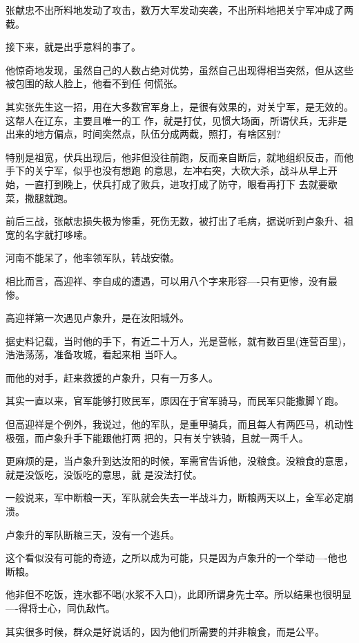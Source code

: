 \documentclass[11pt,a4paper,onecolumn]{article}
\begin{document}
张献忠不出所料地发动了攻击，数万大军发动突袭，不出所料地把关宁军冲成了两截。

接下来，就是出乎意料的事了。

他惊奇地发现，虽然自己的人数占绝对优势，虽然自己出现得相当突然，但从这些被包围的敌人脸上，他看不到任
何慌张。

其实张先生这一招，用在大多数官军身上，是很有效果的，对关宁军，是无效的。这帮人在辽东，主要且唯一的工
作，就是打仗，见惯大场面，所谓伏兵，无非是出来的地方偏点，时间突然点，队伍分成两截，照打，有啥区别?

特别是祖宽，伏兵出现后，他非但没往前跑，反而亲自断后，就地组织反击，而他手下的关宁军，似乎也没有想跑
的意思，左冲右突，大砍大杀，战斗从早上开始，一直打到晚上，伏兵打成了败兵，进攻打成了防守，眼看再打下
去就要歇菜，撒腿就跑。

前后三战，张献忠损失极为惨重，死伤无数，被打出了毛病，据说听到卢象升、祖宽的名字就打哆嗦。

河南不能呆了，他率领军队，转战安徽。

相比而言，高迎祥、李自成的遭遇，可以用八个字来形容----只有更惨，没有最惨。

高迎祥第一次遇见卢象升，是在汝阳城外。

据史料记载，当时他的手下，有近二十万人，光是营帐，就有数百里(连营百里)，浩浩荡荡，准备攻城，看起来相
当吓人。

而他的对手，赶来救援的卢象升，只有一万多人。

其实一直以来，官军能够打败民军，原因在于官军骑马，而民军只能撒脚丫跑。

但高迎祥是个例外，我说过，他的军队，是重甲骑兵，而且每人有两匹马，机动性极强，而卢象升手下能跟他打两
把的，只有关宁铁骑，且就一两千人。

更麻烦的是，当卢象升到达汝阳的时候，军需官告诉他，没粮食。没粮食的意思，就是没饭吃，没饭吃的意思，就
是没法打仗。

一般说来，军中断粮一天，军队就会失去一半战斗力，断粮两天以上，全军必定崩溃。

卢象升的军队断粮三天，没有一个逃兵。

这个看似没有可能的奇迹，之所以成为可能，只是因为卢象升的一个举动----他也断粮。

他非但不吃饭，连水都不喝(水浆不入口)，此即所谓身先士卒。所以结果也很明显----得将士心，同仇敌忾。

其实很多时候，群众是好说话的，因为他们所需要的并非粮食，而是公平。

\section[\thesection]{}
\end{document}

